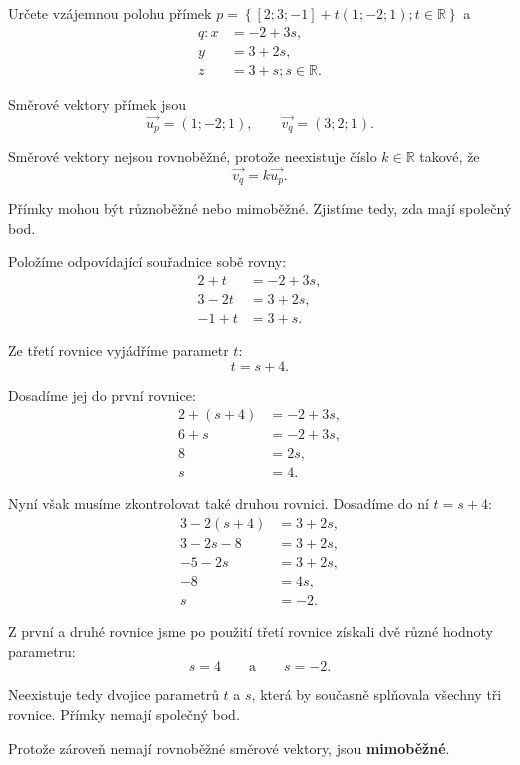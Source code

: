 \begin{example}
    \label{exa:Skew_parametric_lines_space}
    Určete vzájemnou polohu přímek $p=\left\{\left[2;3;-1\right] + t\left(1;-2;1\right); t\in\mathbb{R}\right\}$
    a
    \[
        \begin{aligned}
            q: x&=-2+3s,\\
            y&=3+2s,\\
            z&=3+s; s\in\mathbb{R}.
        \end{aligned}
    \]

    Směrové vektory přímek jsou
    \[
        \vec{u_p}=(1;-2;1),
        \qquad
        \vec{v_q}=(3;2;1).
    \]

    Směrové vektory nejsou rovnoběžné, protože neexistuje číslo
    $k\in\mathbb{R}$ takové, že
    \[
        \vec{v_q}=k\vec{u_p}.
    \]

    Přímky mohou být různoběžné nebo mimoběžné. Zjistíme tedy,
    zda mají společný bod.

    Položíme odpovídající souřadnice sobě rovny:
    \begin{align*}
        2+t &= -2+3s,\\
        3-2t &= 3+2s,\\
        -1+t &= 3+s.
    \end{align*}

    Ze třetí rovnice vyjádříme parametr $t$:
    \[
        t=s+4.
    \]

    Dosadíme jej do první rovnice:
    \begin{align*}
        2+(s+4) &= -2+3s,\\
        6+s &= -2+3s,\\
        8 &= 2s,\\
        s &= 4.
    \end{align*}

    Nyní však musíme zkontrolovat také druhou rovnici.
    Dosadíme do ní $t=s+4$:
    \begin{align*}
        3-2(s+4) &= 3+2s,\\
        3-2s-8 &= 3+2s,\\
        -5-2s &= 3+2s,\\
        -8 &= 4s,\\
        s &= -2.
    \end{align*}

    Z první a druhé rovnice jsme po použití třetí rovnice získali
    dvě různé hodnoty parametru:
    \[
        s=4
        \qquad\text{a}\qquad
        s=-2.
    \]

    Neexistuje tedy dvojice parametrů $t$ a $s$, která by současně
    splňovala všechny tři rovnice. Přímky nemají společný bod.

    Protože zároveň nemají rovnoběžné směrové vektory, jsou
    \textbf{mimoběžné}.
\end{example}

